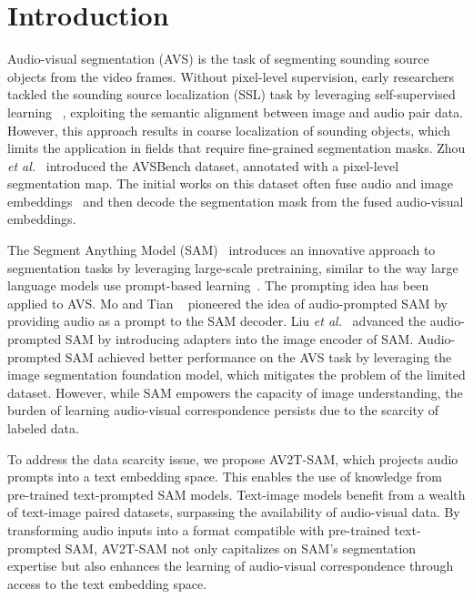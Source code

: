 \section{Introduction}
\label{sec:intro}



Audio-visual segmentation (AVS) is the task of segmenting sounding source objects from the video frames. Without pixel-level supervision, early researchers tackled the sounding source localization (SSL) task by leveraging self-supervised learning~\cite{chen2021sslhard, arandjelovic2018sslobjects}
, exploiting the semantic alignment between image and audio pair data. However, this approach results in coarse localization of sounding objects, which limits the application in fields that require fine-grained segmentation masks. Zhou \textit{et al.}~\cite{zhou2022avs} introduced the AVSBench dataset, annotated with a pixel-level segmentation map. The initial works on this dataset often fuse audio and image embeddings~\cite{zhou2022avs, gao2024avsegformer} and then decode the segmentation mask from the fused audio-visual embeddings. 

The Segment Anything Model (SAM)~\cite{kirillov2023sam, ravi2024sam2} introduces an innovative approach to segmentation tasks by leveraging large-scale pretraining, similar to the way large language models use prompt-based learning~\cite{liu2023prompting}. The prompting idea has been applied to AVS.
Mo and Tian ~\cite{mo2023av} pioneered the idea of audio-prompted SAM by providing audio as a prompt to the SAM decoder. Liu \textit{et al.}~\cite{liu2024annotation} advanced the audio-prompted SAM by introducing adapters into the image encoder of SAM. Audio-prompted SAM achieved better performance on the AVS task by leveraging the image segmentation foundation model, which mitigates the problem of the limited dataset. However, while SAM empowers the capacity of image understanding, the burden of learning audio-visual correspondence persists due to the scarcity of labeled data.


% 

To address the data scarcity issue, we propose AV2T-SAM, which projects audio prompts into a text embedding space. This enables the use of knowledge from pre-trained text-prompted SAM models. Text-image models benefit from a wealth of text-image paired datasets, surpassing the availability of audio-visual data. By transforming audio inputs into a format compatible with pre-trained text-prompted SAM, AV2T-SAM not only capitalizes on SAM’s segmentation expertise but also enhances the learning of audio-visual correspondence through access to the text embedding space.


